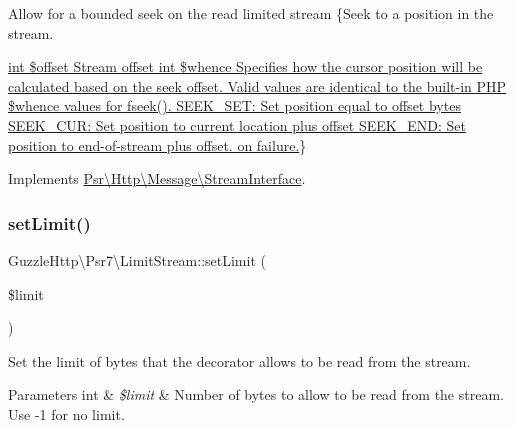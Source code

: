 Allow for a bounded seek on the read limited stream \{Seek to a position in the stream.

\hyperlink{}{int \$offset Stream offset  int \$whence Specifies how the cursor position will be calculated based on the seek offset. Valid values are identical to the built-\/in P\+HP \$whence values for {\ttfamily fseek()}. S\+E\+E\+K\+\_\+\+S\+E\+T\+: Set position equal to offset bytes S\+E\+E\+K\+\_\+\+C\+U\+R\+: Set position to current location plus offset S\+E\+E\+K\+\_\+\+E\+N\+D\+: Set position to end-\/of-\/stream plus offset.   on failure.}\} 

Implements \hyperlink{interfacePsr_1_1Http_1_1Message_1_1StreamInterface_a96ee062dc6cf4022d655dd15eaa81208}{Psr\textbackslash{}\+Http\textbackslash{}\+Message\textbackslash{}\+Stream\+Interface}.

\mbox{\label{classGuzzleHttp_1_1Psr7_1_1LimitStream_ac554a6697ae5de8fd2bd0c6173f5d88b}} 
\subsubsection{\texorpdfstring{set\+Limit()}{setLimit()}}
{\footnotesize\ttfamily Guzzle\+Http\textbackslash{}\+Psr7\textbackslash{}\+Limit\+Stream\+::set\+Limit (\begin{DoxyParamCaption}\item[{}]{\$limit }\end{DoxyParamCaption})}

Set the limit of bytes that the decorator allows to be read from the stream.


\begin{DoxyParams}[1]{Parameters}
int & {\em \$limit} & Number of bytes to allow to be read from the stream. Use -\/1 for no limit. \\
\hline
\end{DoxyParams}
\mbox{\label{classGuzzleHttp_1_1Psr7_1_1LimitStream_a87c2f541e104b649886d56666744cbe5}} 
